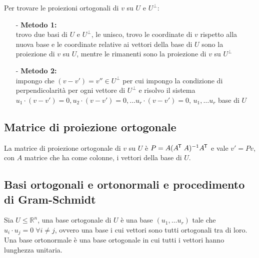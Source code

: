 \documentclass[a4paper]{article}
\newcommand\tran{^{\mkern-1.5mu\mathsf{T}}} %
\begin{document}
Per trovare le proiezioni ortogonali di \(v\) su \(U\) e \(U^\perp\):
\begin{itemize}[topsep=3pt, itemsep=0pt]
	\item[-] \textbf{Metodo 1:}\\
	trovo due basi di \(U\) e \(U^\perp\), le unisco, trovo le coordinate di \(v\) rispetto alla nuova base e le coordinate relative
	ai vettori della base di \(U\) sono la proiezione di \(v\) su \(U\), mentre le rimanenti sono la proiezione di \(v\) su \(U^\perp\)
	\item[-] \textbf{Metodo 2:}\\
	impongo che \((v-v') = v'' \in U^\perp\) per cui impongo la condizione di perpendicolarità per ogni vettore di \(U^\perp\) e risolvo
	il sistema \(u_1 \cdot (v-v') = 0, u_2 \cdot (v-v') = 0, \dots u_r \cdot (v-v') = 0\), \(u_1, \dots u_r\) base di \(U\) 
\end{itemize}

\subsection{Matrice di proiezione ortogonale}
La matrice di proiezione ortogonale di \(v\) su \(U\) è \(P = A(A \tran \; A)^{-1} A \tran\) e vale \(v' = P v\), con \(A\) matrice
che ha come colonne, i vettori della base di \(U\).

\subsection{Basi ortogonali e ortonormali e procedimento di Gram-Schmidt}
Sia \(U \leq \mathbb{R}^n\), una base ortogonale di \(U\) è una base \((u_1, \dots u_r)\) tale che \(u_i \cdot u_j = 0 \; \forall i \neq j\),
ovvero una base i cui vettori sono tutti ortogonali tra di loro. \\
Una base ortonormale è una base ortogonale in cui tutti i vettori hanno lunghezza unitaria.
\end{document}
